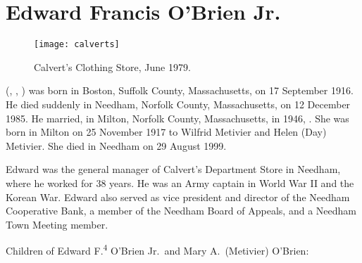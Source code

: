 \section{Edward Francis O'Brien Jr.}\label{per:Edward4OBrien3}

\begin{figure}[htbp]
	\centering
	\texttt{[image: calverts]}
	\caption{Calvert's Clothing Store, June 1979.}
	\label{fig:Calverts}
\end{figure}

 (, , ) was born in Boston, Suffolk County, Massachusetts, on 17 September 1916.\cite{Edward4OBrien3Birth} He died suddenly in Needham, Norfolk County, Massachusetts, on 12 December 1985.\cite{Edward4OBrien3Death} He married, in Milton, Norfolk County, Massachusetts, in 1946, .\cite{Edward4OBrien3Marriage} She was born in Milton on 25 November 1917 to Wilfrid Metivier and Helen (Day) Metivier.\cite{MaryMetivierBirth} She died in Needham on 29 August 1999.\cite{MaryMetivierDeath}

Edward was the general manager of Calvert's Department Store in Needham, where he worked for 38 years. He was an Army captain in World War II and the Korean War. Edward also served as vice president and director of the Needham Cooperative Bank, a member of the Needham Board of Appeals, and a Needham Town Meeting member.\cite{Edward4OBrien3Obit:2}

\pagebreak

\begin{KidsIntro}
	Children of Edward F.\textsuperscript{4} O'Brien Jr.\ and Mary A.\ (Metivier) O'Brien:
\end{KidsIntro}

\begin{Kids}
	\KidNum{}{$\bullet$}
	
	\KidNum{}{$\bullet$}
	
	\KidNum{}{$\bullet$}
	
	\KidNum{}{$\bullet$}
\end{Kids}
